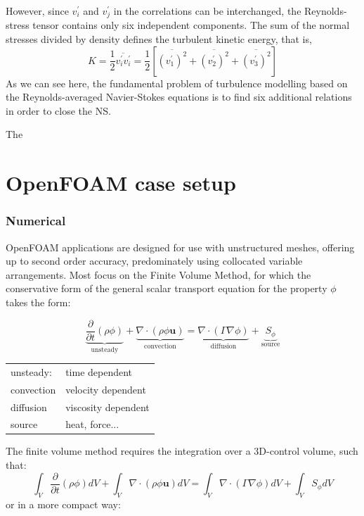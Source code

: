 \documentclass{article}
\begin{document}
However, since $v_i ^\prime$ and $v_j ^\prime$ in the correlations can be interchanged, the Reynolds-stress 
tensor contains only six independent components. The sum of the normal stresses divided by density defines the turbulent kinetic energy, that is,
\begin{equation}
K = \frac{1}{2} \overline{v_i ^\prime v_i ^\prime	} = \frac{1}{2}\left[ \overline{(v_1 ^\prime)^2} + \overline{(v_2 ^\prime)^2} + \overline{(v_3 ^\prime)^2}  \right]
\end{equation}
As we can see here, the fundamental problem of turbulence modelling based on the Reynolds-averaged Navier-Stokes equations is to find six additional relations in order to close the NS.

The 


\part{OpenFOAM case setup}

\section{Numerical}

OpenFOAM applications are designed for use with unstructured meshes, offering up to second order accuracy, predominately using collocated variable arrangements. Most focus on the Finite Volume Method, for which the conservative form of the general scalar transport equation for the property $\phi$ takes the form:

\begin{equation}
\underbrace{\frac{\partial}{\partial t} (\rho\phi)}_{\mathrm{unsteady}} + \underbrace{\nabla \cdot (\rho \phi \textbf{u})}_{\mathrm{convection}} = \underbrace{\nabla \cdot (\Gamma \nabla \phi)}_{\mathrm{diffusion}} + \underbrace{S_{\phi}}_{\mathrm{source}}
\label{eq:transport equation}
\end{equation}


\begin{table}[hbp!]
\begin{tabular}{l l}
	unsteady: &   time dependent\\
	convection & velocity dependent\\
	diffusion & viscosity dependent \\
	source & heat, force...
\end{tabular}
\end{table}
The finite volume method requires the integration over a 3D-control volume, such that:
\begin{equation}
\int_V \frac{\partial}{\partial t} {(\rho \phi)} dV + \int_V \nabla \cdot \left(\rho \phi \textbf{u} \right) dV = \int_V \nabla \cdot \left(\Gamma \nabla \phi \right) dV + \int_V S_\phi dV 
\label{eq:intergal transport equation}
\end{equation}
or in a more compact way:
\end{document}
